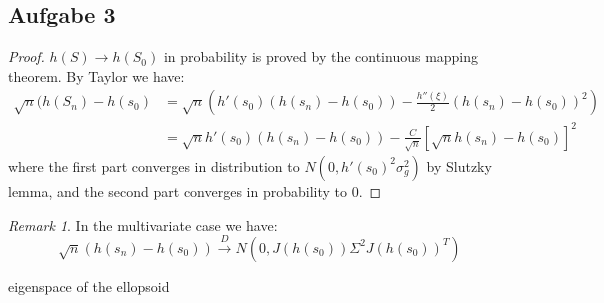 \documentclass[a4paper,11pt]{article}
\theoremstyle{definition}
\theoremstyle{remark}
\newtheorem*{remark}{Remark}
\begin{document}
\subsection*{Aufgabe 3}

\begin{proof}
	$h(S) \longrightarrow h(S_0)$ in probability is proved by the continuous mapping theorem. 
	By Taylor we have:
	\begin{align*}
		\sqrt{n}(h(S_n) - h(s_0) &= \sqrt{n}( h'(s_0)(h(s_n) - h(s_0)) - \frac{h''(\xi)}{2} (h(s_n) - h(s_0))^2)\\
		&= \sqrt{n}h'(s_0)(h(s_n) - h(s_0)) - \frac{C}{\sqrt{n}}[\sqrt{n}h(s_n) - h(s_0)]^2
	\end{align*}
	where the first part converges in distribution to $N(0, h'(s_0)^2 \sigma_g^2 )$ by Slutzky lemma, and the second part converges in probability to 0. 
	
\end{proof}

\begin{remark}
In the multivariate case we have:
\begin{equation*}
	\sqrt{n}( h(s_n) - h(s_0) ) \overset{D}{\longrightarrow} N(0, J(h(s_0)) \Sigma^2 J(h(s_0))^T)
\end{equation*}	
\end{remark}


eigenspace of the ellopsoid 
\end{document}
